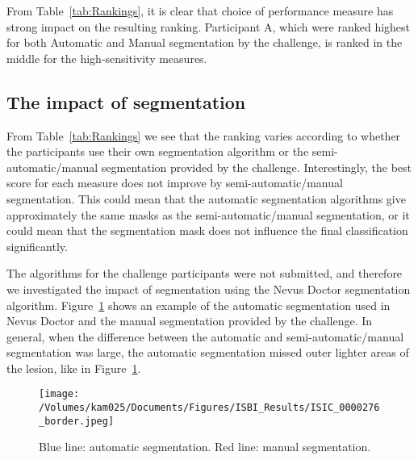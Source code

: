 \documentclass[a4paper,12pt]{article}
\begin{document}
From Table~\ref{tab:Rankings}, it is clear that choice of performance measure has strong impact on the resulting ranking.  
Participant A, which were ranked highest for both Automatic and Manual segmentation by the challenge, is ranked in the middle for the high-sensitivity measures. 

\subsection{The impact of segmentation}

From Table~\ref{tab:Rankings} we see that the ranking varies according to whether the participants use their own segmentation algorithm or the semi-automatic/manual segmentation provided by the challenge. 
Interestingly, the best score for each measure does not improve by semi-automatic/manual segmentation. 
This could mean that the automatic segmentation algorithms give approximately the same masks as the semi-automatic/manual segmentation, or it could mean that the segmentation mask does not influence the final classification significantly.

The algorithms for the challenge participants were not submitted, and therefore we investigated the impact of segmentation using the Nevus Doctor segmentation algorithm. 
Figure~\ref{fig:Border} shows an example of the automatic segmentation used in Nevus Doctor and the manual segmentation provided by the challenge. 
In general, when the difference between the automatic and semi-automatic/manual segmentation was large, the automatic segmentation missed outer lighter areas of the lesion, like in Figure~\ref{fig:Border}. 
\begin{figure}[h!]
     \texttt{[image: /Volumes/kam025/Documents/Figures/ISBI\_Results/ISIC\_0000276\_border.jpeg]}
      \caption{Blue line: automatic segmentation. Red line: manual segmentation.}
       \label{fig:Border}
\end{figure}
\end{document}
